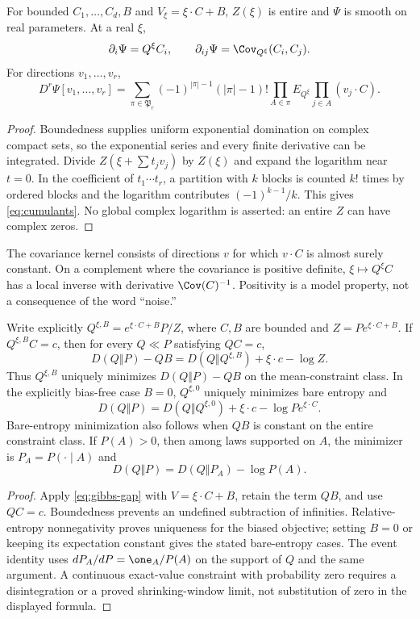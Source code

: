 \begin{proposition}\label{prop:cumulants}
For bounded $C_1,\ldots,C_d,B$ and $V_\xi=\xi\cdot C+B$, $Z(\xi)$ is entire and $\Psi$ is smooth on real parameters. At a real $\xi$,
\[
 \partial_i\Psi=Q^\xi C_i,\qquad \partial_{ij}\Psi=\Cov_{Q^\xi}(C_i,C_j).
\]
For directions $v_1,\ldots,v_r$,
\begin{equation}
 D^r\Psi[v_1,\ldots,v_r]
 =\sum_{\pi\in\mathfrak P_r}(-1)^{|\pi|-1}(|\pi|-1)!
 \prod_{A\in\pi}E_{Q^\xi}\prod_{j\in A}(v_j\cdot C).
 \label{eq:cumulants}
\end{equation}
\end{proposition}
\begin{proof}
Boundedness supplies uniform exponential domination on complex compact sets, so the exponential series and every finite derivative can be integrated. Divide $Z(\xi+\sum t_jv_j)$ by $Z(\xi)$ and expand the logarithm near $t=0$. In the coefficient of $t_1\cdots t_r$, a partition with $k$ blocks is counted $k!$ times by ordered blocks and the logarithm contributes $(-1)^{k-1}/k$. This gives \eqref{eq:cumulants}. No global complex logarithm is asserted: an entire $Z$ can have complex zeros.
\end{proof}

The covariance kernel consists of directions $v$ for which $v\cdot C$ is almost surely constant. On a complement where the covariance is positive definite, $\xi\mapsto Q^\xi C$ has a local inverse with derivative $\Cov(C)^{-1}$. Positivity is a model property, not a consequence of the word ``noise.''

\begin{proposition}\label{prop:constraints}
Write explicitly $Q^{\xi,B}=e^{\xi\cdot C+B}P/Z$, where $C,B$ are bounded and $Z=Pe^{\xi\cdot C+B}$. If $Q^{\xi,B}C=c$, then for every $Q\ll P$ satisfying $QC=c$,
\[
 D(Q\Vert P)-QB=D(Q\Vert Q^{\xi,B})+\xi\cdot c-\log Z.
\]
Thus $Q^{\xi,B}$ uniquely minimizes $D(Q\Vert P)-QB$ on the mean-constraint class. In the explicitly bias-free case $B=0$, $Q^{\xi,0}$ uniquely minimizes bare entropy and
\[
 D(Q\Vert P)=D(Q\Vert Q^{\xi,0})+\xi\cdot c-\log Pe^{\xi\cdot C}.
\]
Bare-entropy minimization also follows when $QB$ is constant on the entire constraint class. If $P(A)>0$, then among laws supported on $A$, the minimizer is $P_A=P(\cdot\mid A)$ and
\[
 D(Q\Vert P)=D(Q\Vert P_A)-\log P(A).
\]
\end{proposition}
\begin{proof}
Apply \eqref{eq:gibbs-gap} with $V=\xi\cdot C+B$, retain the term $QB$, and use $QC=c$. Boundedness prevents an undefined subtraction of infinities. Relative-entropy nonnegativity proves uniqueness for the biased objective; setting $B=0$ or keeping its expectation constant gives the stated bare-entropy cases. The event identity uses $dP_A/dP=\one_A/P(A)$ on the support of $Q$ and the same argument. A continuous exact-value constraint with probability zero requires a disintegration or a proved shrinking-window limit, not substitution of zero in the displayed formula.
\end{proof}

